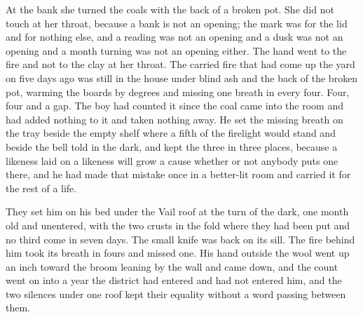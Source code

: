 \scenebreak

At the bank she turned the coals with the back of a broken pot. She did not touch  at her throat, because a bank is not an opening; the mark was for the lid and for nothing else, and a reading was not an opening and a dusk was not an opening and a month turning was not an opening either. The hand went to the fire and not to the clay at her throat. The carried fire that had come up the yard on  five days ago was still in the house under blind ash and the back of the broken pot, warming the boards by degrees and missing one breath in every four. Four, four and a gap. The boy had counted it since the coal came into the room and had added nothing to it and taken nothing away. He set the missing breath on the tray beside the empty shelf where a fifth of the firelight would stand and beside the bell told in the dark, and kept the three in three places, because a likeness laid on a likeness will grow a cause whether or not anybody puts one there, and he had made that mistake once in a better-lit room and carried it for the rest of a life.

They set him on his bed under the Vail roof at the turn of the dark, one month old and unentered, with the two crusts in the fold where they had been put and no third come in seven days. The small knife was back on its sill. The fire behind him took its breath in fours and missed one. His hand outside the wool went up an inch toward the broom leaning by the wall and came down, and the count went on into a year the district had entered and had not entered him, and the two silences under one roof kept their equality without a word passing between them.
